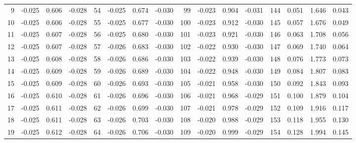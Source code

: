 \begin{table}
{\begin{tabular}{rrrr|rrrr|rrrr|crrr}
  9 & \tiny{ -0.025} &   0.606 & \tiny{ -0.028} &  54 & \tiny{ -0.025} &   0.674 & \tiny{ -0.030} &  99 & \tiny{ -0.023} &   0.904 & \tiny{ -0.031} & 144 & \tiny{  0.051} &   1.646 & \tiny{  0.043}\\
 10 & \tiny{ -0.025} &   0.606 & \tiny{ -0.028} &  55 & \tiny{ -0.025} &   0.677 & \tiny{ -0.030} & 100 & \tiny{ -0.023} &   0.912 & \tiny{ -0.030} & 145 & \tiny{  0.057} &   1.676 & \tiny{  0.049}\\
 11 & \tiny{ -0.025} &   0.607 & \tiny{ -0.028} &  56 & \tiny{ -0.025} &   0.680 & \tiny{ -0.030} & 101 & \tiny{ -0.023} &   0.921 & \tiny{ -0.030} & 146 & \tiny{  0.063} &   1.708 & \tiny{  0.056}\\
 12 & \tiny{ -0.025} &   0.607 & \tiny{ -0.028} &  57 & \tiny{ -0.026} &   0.683 & \tiny{ -0.030} & 102 & \tiny{ -0.022} &   0.930 & \tiny{ -0.030} & 147 & \tiny{  0.069} &   1.740 & \tiny{  0.064}\\
 13 & \tiny{ -0.025} &   0.608 & \tiny{ -0.028} &  58 & \tiny{ -0.026} &   0.686 & \tiny{ -0.030} & 103 & \tiny{ -0.022} &   0.939 & \tiny{ -0.030} & 148 & \tiny{  0.076} &   1.773 & \tiny{  0.073}\\
 14 & \tiny{ -0.025} &   0.609 & \tiny{ -0.028} &  59 & \tiny{ -0.026} &   0.689 & \tiny{ -0.030} & 104 & \tiny{ -0.022} &   0.948 & \tiny{ -0.030} & 149 & \tiny{  0.084} &   1.807 & \tiny{  0.083}\\
 15 & \tiny{ -0.025} &   0.609 & \tiny{ -0.028} &  60 & \tiny{ -0.026} &   0.693 & \tiny{ -0.030} & 105 & \tiny{ -0.021} &   0.958 & \tiny{ -0.030} & 150 & \tiny{  0.092} &   1.843 & \tiny{  0.093}\\
 16 & \tiny{ -0.025} &   0.610 & \tiny{ -0.028} &  61 & \tiny{ -0.026} &   0.696 & \tiny{ -0.030} & 106 & \tiny{ -0.021} &   0.968 & \tiny{ -0.029} & 151 & \tiny{  0.100} &   1.879 & \tiny{  0.104}\\
 17 & \tiny{ -0.025} &   0.611 & \tiny{ -0.028} &  62 & \tiny{ -0.026} &   0.699 & \tiny{ -0.030} & 107 & \tiny{ -0.021} &   0.978 & \tiny{ -0.029} & 152 & \tiny{  0.109} &   1.916 & \tiny{  0.117}\\
 18 & \tiny{ -0.025} &   0.611 & \tiny{ -0.028} &  63 & \tiny{ -0.026} &   0.703 & \tiny{ -0.030} & 108 & \tiny{ -0.020} &   0.988 & \tiny{ -0.029} & 153 & \tiny{  0.118} &   1.955 & \tiny{  0.130}\\
 19 & \tiny{ -0.025} &   0.612 & \tiny{ -0.028} &  64 & \tiny{ -0.026} &   0.706 & \tiny{ -0.030} & 109 & \tiny{ -0.020} &   0.999 & \tiny{ -0.029} & 154 & \tiny{  0.128} &   1.994 & \tiny{  0.145}\\

\end{tabular}}
\end{table}
